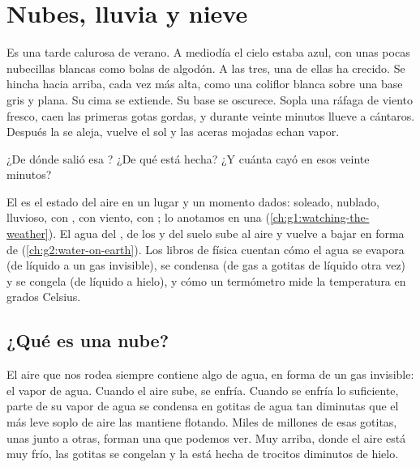 \chapter{Nubes, lluvia y nieve}\label{ch:g4:clouds-rain-snow}

Es una tarde calurosa de verano. A mediodía el cielo estaba azul, con unas
pocas nubecillas blancas como bolas de algodón. A las tres, una de ellas ha
crecido. Se hincha hacia arriba, cada vez más alta, como una coliflor
blanca sobre una base gris y plana. Su cima se extiende. Su base se
oscurece. Sopla una ráfaga de viento fresco, caen las primeras gotas
gordas, y durante veinte minutos llueve a cántaros. Después la  se
aleja, vuelve el sol y las aceras mojadas echan vapor.

¿De dónde salió esa ? ¿De qué está hecha? ¿Y cuánta  cayó en esos
veinte minutos?

\begin{recall}
El  es el estado del aire en un lugar y un momento dados: soleado,
nublado, lluvioso, con , con viento, con ; lo anotamos en una
 (\cref{ch:g1:watching-the-weather}). El agua del , de
los  y del suelo sube al aire y vuelve a bajar en forma de 
(\cref{ch:g2:water-on-earth}). Los libros de física cuentan cómo el agua se
evapora (de líquido a un gas invisible), se condensa (de gas a gotitas de
líquido otra vez) y se congela (de líquido a hielo), y cómo un termómetro
mide la temperatura en grados Celsius.
\end{recall}

\section{¿Qué es una nube?}

El aire que nos rodea siempre contiene algo de agua, en forma de un gas
invisible: el vapor de agua. Cuando el aire sube, se enfría. Cuando se
enfría lo suficiente, parte de su vapor de agua se condensa en gotitas de
agua tan diminutas que el más leve soplo de aire las mantiene flotando.
Miles de millones de esas gotitas, unas junto a otras, forman una  que
podemos ver. Muy arriba, donde el aire está muy frío, las gotitas se
congelan y la  está hecha de trocitos diminutos de hielo.


